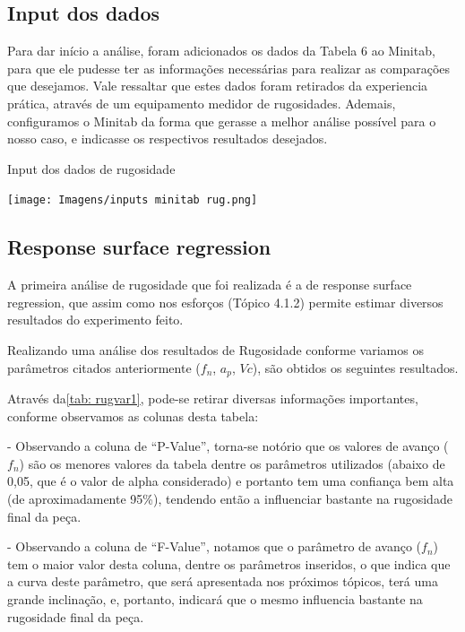 \documentclass[deposito, acronym, symbols]{fei}
\begin{document}
\subsection{Input dos dados}

Para dar início a análise, foram adicionados os dados da Tabela 6 ao Minitab, para que ele pudesse ter as informações necessárias para realizar as comparações que desejamos. 
Vale ressaltar que estes dados foram retirados da experiencia prática, através de um equipamento medidor de rugosidades. 
Ademais, configuramos o Minitab da forma que gerasse a melhor análise possível para o nosso caso, e indicasse os respectivos resultados desejados.

\begin{table}[!htb]
 \centering
    \caption{Input dos dados de rugosidade}
    \texttt{[image: Imagens/inputs minitab rug.png]}
    \label{tab: ruginp}
 \end{table}

 \subsection{Response surface regression}
 
A primeira análise de rugosidade que foi realizada é a de response surface regression, que assim como nos esforços (Tópico 4.1.2) permite estimar diversos resultados do experimento feito.
 
Realizando uma análise dos resultados de Rugosidade conforme variamos os parâmetros citados anteriormente ($f_n$, $a_p$, $Vc$), são obtidos os seguintes resultados. 

Através da\ref{tab: rugvar1}, pode-se retirar diversas informações importantes, conforme observamos as colunas desta tabela:

- Observando a coluna de “P-Value”, torna-se notório que os valores de avanço ($f_n$) são os menores valores da tabela dentre os parâmetros utilizados (abaixo de 0,05, que é o valor de alpha considerado) e portanto tem uma confiança bem alta (de aproximadamente 95\%), tendendo então a influenciar bastante na rugosidade final da peça.

- Observando a coluna de “F-Value”, notamos que o parâmetro de avanço ($f_n$) tem o maior valor desta coluna, dentre os parâmetros inseridos, o que indica que a curva deste parâmetro, que será apresentada nos próximos tópicos, terá uma grande inclinação, e, portanto, indicará que o mesmo influencia bastante na rugosidade final da peça.
\end{document}

